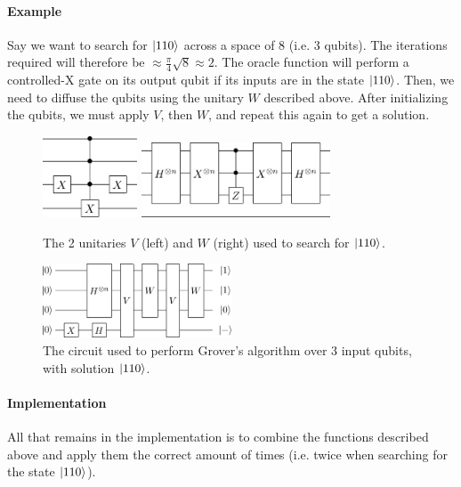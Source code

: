 \documentclass[a4paper,10pt, titlepage, twoside]{article}
\begin{document}
\paragraph{Example}
Say we want to search for $\ket{110}$ across a space of 8 (i.e. 3 qubits). The iterations required will therefore be $\approx \frac{\pi}{4} \sqrt{8} \approx 2$. The oracle function will perform a controlled-X gate on its output qubit if its inputs are in the state $\ket{110}$. Then, we need to diffuse the qubits using the unitary $W$ described above. After initializing the qubits, we must apply $V$, then $W$, and repeat this again to get a solution. 
\begin{figure}[H]
    \centering
    \includegraphics[width=0.25\textwidth]{grovers110V}
    \hspace{1cm}
    \includegraphics[width=0.5\textwidth]{grovers110W}
    \caption{The 2 unitaries $V$ (left) and $W$ (right) used to search for $\ket{110}$.}
\end{figure}
\begin{figure}[H]
    \centering
    \includegraphics[width=0.5\textwidth]{grovers110}
    \caption{The circuit used to perform Grover's algorithm over 3 input qubits, with solution $\ket{110}$.}
\end{figure}

\paragraph{Implementation}
All that remains in the implementation is to combine the functions described above and apply them the correct amount of times (i.e. twice when searching for the state $\ket{110}$).
\end{document}
